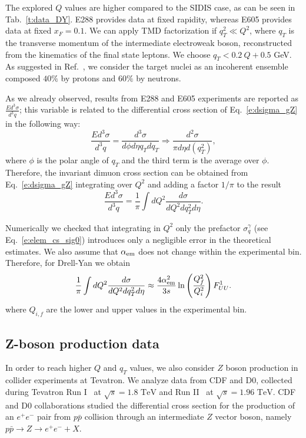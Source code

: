 \documentclass[aps,preprintnumbers,showpacs,nofootinbib,superscriptaddress,floatfix]{revtex4}
\begin{document}
The explored $Q$ values are higher compared to the SIDIS case, as can be seen
in Tab.~\ref{t:data_DY}. E288 provides data at fixed rapidity,
whereas E605 provides data at fixed $x_F=0.1$.  
We can apply TMD factorization if
$q_T^2 \ll Q^2$, where $q_T$ is the transverse
momentum of the intermediate electroweak boson, reconstructed from the
kinematics of the final state leptons. We choose $q_T <
0.2\ Q + 0.5$ GeV. 
As suggested in Ref.~\cite{Ito:1980ev}, we consider the target nuclei as an
incoherent ensemble composed $40\%$ by protons and $60\%$ by neutrons.

As we already observed, results from E288 and E605 experiments are reported as
$\frac{Ed^3\sigma}{d^3q}$; this variable is related to the differential cross
section of Eq.~\eqref{e:dsigma_gZ} in the following way:
\begin{equation}
\frac{Ed^3\sigma}{d^3q}=\frac{d^3\sigma}{d\phi d\eta q_T dq_T} \Rightarrow \frac{d^2\sigma}{\pi d\eta d(q^2_T)},
\end{equation}
where $\phi$ is the polar angle of $q_T$ and 
the third term is the average over $\phi$.
Therefore, the invariant dimuon cross section can be obtained from Eq.~\eqref{e:dsigma_gZ} integrating over $Q^2$ and adding a factor $1/\pi$ to the result
\begin{equation}
\frac{Ed^3\sigma}{d^3q} = \frac{1}{\pi} \int dQ^2 \frac{d\sigma}{dQ^2dq^2_T d\eta} .
\end{equation}

Numerically we checked that integrating in $Q^2$ only the prefactor
$\sigma_q^\gamma$ (see Eq.~\eqref{e:elem_cs_sig0}) introduces only
a negligible error in the theoretical estimates. We also assume that
$\alpha_{\rm em}$ does not change within the experimental bin. Therefore, for Drell-Yan we
obtain
\begin{equation}
\frac{1}{\pi} \int dQ^2 \frac{d\sigma}{dQ^2dq^2_T d\eta}
\approx 
\frac{4\alpha_{\rm em}^2}{3 s} \ln \left( \frac{Q_f^2}{Q_i^2} \right)
F_{UU}^1. 
\end{equation}
where $Q_{i,f}$ are the lower and upper values in the experimental bin. 


\subsection{Z-boson production data}
\label{ss:zboson}

In order to reach higher $Q$ and $q_T$ values, we also consider $Z$ boson production in collider experiments at Tevatron. 
We analyze data from CDF and D0, collected during Tevatron Run I~\cite{Affolder:1999jh,Abbott:1999wk} at $\sqrt{s}=1.8\text{ TeV}$ and Run II~\cite{Aaltonen:2012fi,Abazov:2007ac} at $\sqrt{s}=1.96\text{ TeV}$. CDF and D0 collaborations studied the differential cross section for the production of an $e^+e^-$ pair from $p\bar{p}$ collision through an intermediate $Z$ vector boson, namely $p\bar{p}\rightarrow Z \rightarrow e^+e^- + X$. 
\end{document}
